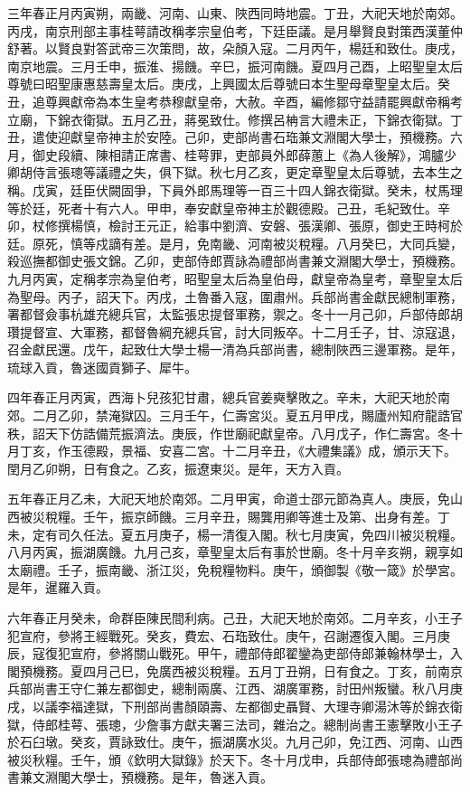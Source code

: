 \begin{pinyinscope}
三年春正月丙寅朔，兩畿、河南、山東、陜西同時地震。丁丑，大祀天地於南郊。丙戌，南京刑部主事桂萼請改稱孝宗皇伯考，下廷臣議。是月舉賢良對策西漢董仲舒著。以賢良對答武帝三次策問，故，朵顏入寇。二月丙午，楊廷和致仕。庚戌，南京地震。三月壬申，振淮、揚饑。辛巳，振河南饑。夏四月己酉，上昭聖皇太后尊號曰昭聖康惠慈壽皇太后。庚戌，上興國太后尊號曰本生聖母章聖皇太后。癸丑，追尊興獻帝為本生皇考恭穆獻皇帝，大赦。辛酉，編修鄒守益請罷興獻帝稱考立廟，下錦衣衛獄。五月乙丑，蔣冕致仕。修撰呂柟言大禮未正，下錦衣衛獄。丁丑，遣使迎獻皇帝神主於安陸。己卯，吏部尚書石珤兼文淵閣大學士，預機務。六月，御史段續、陳相請正席書、桂萼罪，吏部員外郎薛蕙上《為人後解》，鴻臚少卿胡侍言張璁等議禮之失，俱下獄。秋七月乙亥，更定章聖皇太后尊號，去本生之稱。戊寅，廷臣伏闕固爭，下員外郎馬理等一百三十四人錦衣衛獄。癸未，杖馬理等於廷，死者十有六人。甲申，奉安獻皇帝神主於觀德殿。己丑，毛紀致仕。辛卯，杖修撰楊慎，檢討王元正，給事中劉濟、安磐、張漢卿、張原，御史王時柯於廷。原死，慎等戍謫有差。是月，免南畿、河南被災稅糧。八月癸巳，大同兵變，殺巡撫都御史張文錦。乙卯，吏部侍郎賈詠為禮部尚書兼文淵閣大學士，預機務。九月丙寅，定稱孝宗為皇伯考，昭聖皇太后為皇伯母，獻皇帝為皇考，章聖皇太后為聖母。丙子，詔天下。丙戌，土魯番入寇，圍肅州。兵部尚書金獻民總制軍務，署都督僉事杭雄充總兵官，太監張忠提督軍務，禦之。冬十一月己卯，戶部侍郎胡瓚提督宣、大軍務，都督魯綱充總兵官，討大同叛卒。十二月壬子，甘、涼寇退，召金獻民還。戊午，起致仕大學士楊一清為兵部尚書，總制陜西三邊軍務。是年，琉球入貢，魯迷國貢獅子、犀牛。

四年春正月丙寅，西海卜兒孩犯甘肅，總兵官姜奭擊敗之。辛未，大祀天地於南郊。二月乙卯，禁淹獄囚。三月壬午，仁壽宮災。夏五月甲戌，賜廬州知府龍誥官秩，詔天下仿誥備荒振濟法。庚辰，作世廟祀獻皇帝。八月戊子，作仁壽宮。冬十月丁亥，作玉德殿，景福、安喜二宮。十二月辛丑，《大禮集議》成，頒示天下。閏月乙卯朔，日有食之。乙亥，振遼東災。是年，天方入貢。

五年春正月乙未，大祀天地於南郊。二月甲寅，命道士邵元節為真人。庚辰，免山西被災稅糧。壬午，振京師饑。三月辛丑，賜龔用卿等進士及第、出身有差。丁未，定有司久任法。夏五月庚子，楊一清復入閣。秋七月庚寅，免四川被災稅糧。八月丙寅，振湖廣饑。九月己亥，章聖皇太后有事於世廟。冬十月辛亥朔，親享如太廟禮。壬子，振南畿、浙江災，免稅糧物料。庚午，頒御製《敬一箴》於學宮。是年，暹羅入貢。

六年春正月癸未，命群臣陳民間利病。己丑，大祀天地於南郊。二月辛亥，小王子犯宣府，參將王經戰死。癸亥，費宏、石珤致仕。庚午，召謝遷復入閣。三月庚辰，寇復犯宣府，參將關山戰死。甲午，禮部侍郎翟鑾為吏部侍郎兼翰林學士，入閣預機務。夏四月己巳，免廣西被災稅糧。五月丁丑朔，日有食之。丁亥，前南京兵部尚書王守仁兼左都御史，總制兩廣、江西、湖廣軍務，討田州叛蠻。秋八月庚戌，以議李福達獄，下刑部尚書顏頤壽、左都御史聶賢、大理寺卿湯沐等於錦衣衛獄，侍郎桂萼、張璁，少詹事方獻夫署三法司，雜治之。總制尚書王憲擊敗小王子於石臼墩。癸亥，賈詠致仕。庚午，振湖廣水災。九月己卯，免江西、河南、山西被災秋糧。壬午，頒《欽明大獄錄》於天下。冬十月戊申，兵部侍郎張璁為禮部尚書兼文淵閣大學士，預機務。是年，魯迷入貢。


\end{pinyinscope}
